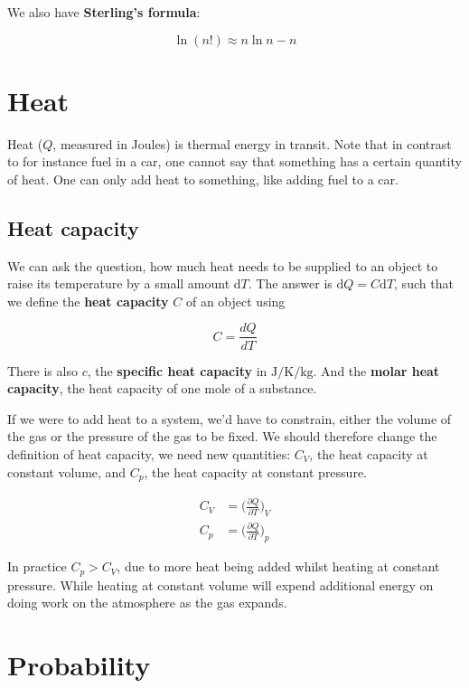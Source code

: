 \documentclass[a4paper]{article}
\begin{document}
We also have \textbf{Sterling's formula}:

\begin{equation}
	\ln(n!)\approx n\ln n-n
\end{equation}

\section{Heat}

Heat ($Q$, measured in Joules) is thermal energy in transit. Note that in contrast to for instance fuel in a car, one cannot say that something has a certain quantity of heat. One can only add heat to something, like adding fuel to a car.

\subsection{Heat capacity}

We can ask the question, how much heat needs to be supplied to an object to raise its temperature by a small amount d$T$. The answer is $\text{d}Q=C\text{d}T$, such that we define the \textbf{heat capacity} $C$ of an object using

\begin{equation}
	C=\frac{dQ}{dT}
\end{equation}

There is also $c$, the \textbf{specific heat capacity} in $\si{\joule\per\kelvin\per\kilo\gram}$. And the \textbf{molar heat capacity}, the heat capacity of one mole of a substance. 

\bigskip

If we were to add heat to a system, we'd have to constrain, either the volume of the gas or the pressure of the gas to be fixed. We should therefore change the definition of heat capacity, we need new quantities: $C_V$, the heat capacity at constant volume, and $C_p$, the heat capacity at constant pressure.

\begin{align}
	C_V&=\bigg(\frac{\partial Q}{\partial T}\bigg)_V\\[1em]
	C_p&=\bigg(\frac{\partial Q}{\partial T}\bigg)_p
\end{align}

In practice $C_p>C_V$, due to more heat being added whilst heating at constant pressure. While heating at constant volume will expend additional energy on doing work on the atmosphere as the gas expands. 

\section{Probability}
\end{document}
